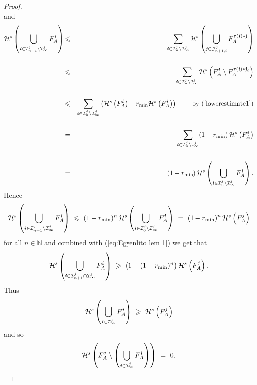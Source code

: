 \documentclass[11pt,english,british]{article}
\numberwithin{equation}{section}
\renewcommand{\geq}{\geqslant}
\renewcommand{\leq}{\leqslant}
\begin{document}
\begin{proof}
\[\]
and 
\begin{eqnarray*}
\mathcal{H}^{s}\left(\bigcup_{\textbf{\emph{i}}\in\mathcal{I}_{n+1}^{j}\setminus\mathcal{I}_{\infty}^{j}}F_{A}^{\textbf{\emph{i}}}\right) &\leq& \sum_{\textbf{\emph{i}}\in\mathcal{I}_{n}^{j}\setminus\mathcal{I}_{\infty}^{j}}\mathcal{H}^{s}\left(\bigcup_{\textbf{\emph{j}}\in\mathcal{J}_{n+1,\textbf{\emph{i}}}^{j}}F_{A}^{\tau(\textbf{\emph{i}})*\textbf{\emph{j}}}\right)\\ \\
&\leq& \sum_{\textbf{\emph{i}}\in\mathcal{I}_{n}^{j}\setminus\mathcal{I}_{\infty}^{j}}\mathcal{H}^{s}\left( F_{A}^{\textbf{\emph{i}}}  \setminus   F_{A}^{\tau(\textbf{\emph{i}})*\textbf{\emph{j}}_{i}}    \right)\\ \\
&\leq& \sum_{\textbf{\emph{i}}\in\mathcal{I}_{n}^{j}\setminus\mathcal{I}_{\infty}^{j}}\left(\mathcal{H}^{s}\left(F_{A}^{\textbf{\emph{i}}}\right)-r_{\mathrm{min}}\mathcal{H}^{s}\left(F_{A}^{\textbf{\emph{i}}}\right)\right) \qquad \text{ by (\ref{lowerestimate1})}\\ \\
&=&\sum_{\textbf{\emph{i}}\in\mathcal{I}_{n}^{j}\setminus\mathcal{I}_{\infty}^{j}}(1-r_{\mathrm{min}})\, \mathcal{H}^{s}\left(F_{A}^{\textbf{\emph{i}}}\right) \\ \\
&=&(1-r_{\mathrm{min}})\, \mathcal{H}^{s}\left(\bigcup_{\textbf{\emph{i}}\in\mathcal{I}_{n}^{j}\setminus\mathcal{I}_{\infty}^{j}}F_{A}^{\textbf{\emph{i}}}\right).
\end{eqnarray*}
Hence
\[
\mathcal{H}^{s}\left(\bigcup_{\textbf{\emph{i}}\in\mathcal{I}_{n+1}^{j}\setminus\mathcal{I}_{\infty}^{j}}F_{A}^{\textbf{\emph{i}}}\right) \ \leq \ (1-r_{\mathrm{min}})^{n}\, \mathcal{H}^{s}\left(\bigcup_{\textbf{\emph{i}}\in\mathcal{I}_{0}^{j}\setminus\mathcal{I}_{\infty}^{j}}F_{A}^{\textbf{\emph{i}}}\right) \ = \ (1-r_{\mathrm{min}})^{n}\, \mathcal{H}^{s}\left(F_{A}^{j}\right)
\]
for all $n\in\mathbb{N}$ and combined with (\ref{eq:Egyenlito lem 1})
we get that
\[
\mathcal{H}^{s}\left(\bigcup_{\textbf{\emph{i}}\in\mathcal{I}_{n+1}^{j}\cap\mathcal{I}_{\infty}^{j}}F_{A}^{\textbf{\emph{i}}}\right) \ \geq \ \big(1-(1-r_{\mathrm{min}})^{n}\big)\, \mathcal{H}^{s}\left(F_{A}^{j}\right).
\]
Thus 
\[
\mathcal{H}^{s}\left(\bigcup_{\textbf{\emph{i}}\in\mathcal{I}_{\infty}^{j}}F_{A}^{\textbf{\emph{i}}}\right) \ \geq \ \mathcal{H}^{s}\left(F_{A}^{j}\right)
\]
and so \[
\mathcal{H}^{s}\left(F_{A}^{j}\setminus\left(\bigcup_{\textbf{\emph{i}}\in\mathcal{I}_{\infty}^{j}}F_{A}^{\textbf{\emph{i}}}\right)\right) \ = \ 0.
\]


\end{proof}
\end{document}
